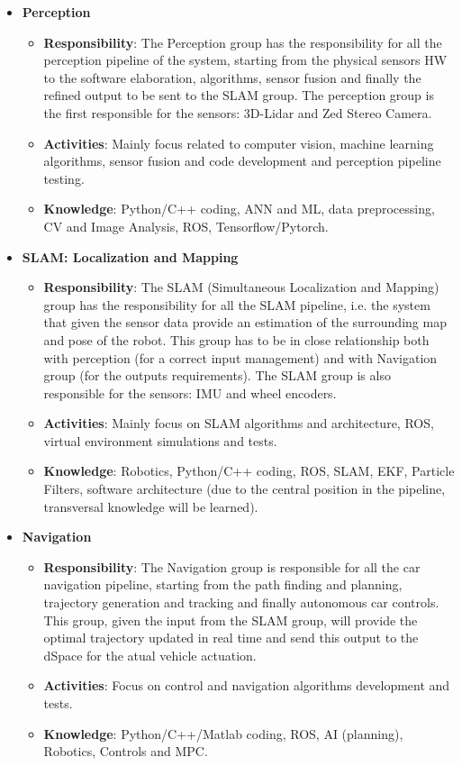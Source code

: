 \documentclass[graybox]{svmult}
\begin{document}
\begin{itemize}
	\item \textbf{Perception}
	\begin{itemize}
		\item \textbf{Responsibility}: The Perception group has the responsibility for all the perception pipeline of the system, starting from the physical sensors HW to the software elaboration, algorithms, sensor fusion and finally the refined output to be sent to the SLAM group. The perception group is the first responsible for the sensors: 3D-Lidar and Zed Stereo Camera.
		\item \textbf{Activities}: Mainly focus related to computer vision, machine learning algorithms, sensor fusion and code development and perception pipeline testing.
		\item \textbf{Knowledge}: Python/C++ coding, ANN and ML, data preprocessing, CV and Image Analysis, ROS, Tensorflow/Pytorch.
	\end{itemize}
    
	\item \textbf{SLAM: Localization and Mapping}
	\begin{itemize}
		\item \textbf{Responsibility}: The SLAM (Simultaneous Localization and Mapping) group has the responsibility for all the SLAM pipeline, i.e. the system that given the sensor data provide an estimation of the surrounding map and pose of the robot. This group has to be in close relationship both with perception (for a correct input management) and with Navigation group (for the outputs requirements). The SLAM group is also responsible for the sensors: IMU and wheel encoders. 
        \item \textbf{Activities}: Mainly focus on SLAM algorithms and architecture, ROS, virtual environment simulations and tests.
		\item \textbf{Knowledge}: Robotics, Python/C++ coding, ROS, SLAM, EKF, Particle Filters, software architecture (due to the central position in the pipeline, transversal knowledge will be learned).
	\end{itemize}

	\item \textbf{Navigation}
	\begin{itemize}
		\item \textbf{Responsibility}: The Navigation group is responsible for all the car navigation pipeline, starting from the path finding and planning, trajectory generation and tracking and finally autonomous car controls. This group, given the input from the SLAM group, will provide the optimal trajectory updated in real time and send this output to the dSpace for the atual vehicle actuation.
		 \item \textbf{Activities}: Focus on control and navigation algorithms development and tests. 
		\item \textbf{Knowledge}: Python/C++/Matlab coding, ROS, AI (planning), Robotics, Controls and MPC.
	\end{itemize}


\end{itemize}
\end{document}
